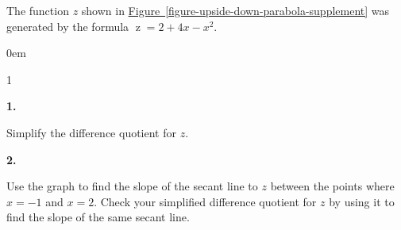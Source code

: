 \documentclass[12pt,]{book}
\theoremstyle{plain}
\theoremstyle{definition}
\numberwithin{equation}{section}
\newcommand{\hrulemedium}{\noalign{\hrule height 0.07em}}
\newcommand{\hrulethick} {\noalign{\hrule height 0.11em}}
\newcounter{figstack}
\newcounter{figindex}
\newlength\fight
\newcommand\pushValignCaptionBottom[5][b]{%
\stepcounter{figstack}%
\expandafter\def\csname %
figalign\romannumeral\value{figstack}\endcsname{#1}%
\expandafter\def\csname %
figtype\romannumeral\value{figstack}\endcsname{#2}%
\expandafter\def\csname %
figwd\romannumeral\value{figstack}\endcsname{#3}%
\expandafter\def\csname %
figcontent\romannumeral\value{figstack}\endcsname{#4}%
\expandafter\def\csname %
figcap\romannumeral\value{figstack}\endcsname{#5}%
\setbox0=\hbox{%
\begin{#2}{#3}#4\end{#2}}%
\ifdim\dimexpr\ht0+\dp0\relax>\fight\global\setlength{\fight}{%
\dimexpr\ht0+\dp0\relax}\fi%
}
\newcommand\popValignCaptionBottom{%
\setcounter{figindex}{0}%
\hfill%
\whiledo{\value{figindex}<\value{figstack}}{%
\stepcounter{figindex}%
\def\tmp{\csname figwd\romannumeral\value{figindex}\endcsname}%
\begin{\csname figtype\romannumeral\value{figindex}\endcsname}[t]{\tmp}%
\centering%
\stackinset{c}{}%
{\csname figalign\romannumeral\value{figindex}\endcsname}{}%
{\csname figcontent\romannumeral\value{figindex}\endcsname}%
{\rule{0pt}{\fight}}\par%
\csname figcap\romannumeral\value{figindex}\endcsname%
\end{\csname figtype\romannumeral\value{figindex}\endcsname}%
\hfill%
}%
\setcounter{figstack}{0}%
\setlength{\fight}{0pt}%
\hfill%
}
\newenvironment{exercisegroup}%
{\medskip\noindent}%
{\par\bigskip}%
\newlength{\exercisegroupindent}%
\newlength{\exercisegroupitemwidth}%
\newenvironment{exercisegrouplist}%
{\vspace{-\partopsep}%
\begin{adjustwidth}{\exercisegroupindent}{0em}}%
{\end{adjustwidth}%
\vspace{-\partopsep}%
\vspace{\baselineskip}}%
\newenvironment{exercisegroupbycol}[1]%
{\begin{exercisegrouplist}%
\vspace{-\multicolsep}%
\begin{multicols}{#1}%
\setlength{\parindent}{0em}%
\setlength{\exercisegroupitemwidth}{\linewidth}}%
{\end{multicols}%
\vspace{-\multicolsep}%
\end{exercisegrouplist}}%
\newenvironment{exercisegroupitem}[1]%
{\begin{minipage}[t]{\exercisegroupitemwidth}
\vspace{0pt}%
{\bfseries#1}%
\rule{0pt}{\baselineskip}}{\strut%
\end{minipage}%
\hspace{\columnsep}}%
\providecommand\phantomsection{}
\newcommand{\fe}[2]{\mathop{{#1}{\left(#2\right)}}}
\begin{document}
\begin{exercisegroup}%
The function \(z\) shown in \hyperref[figure-upside-down-parabola-supplement]{Figure~\ref*{figure-upside-down-parabola-supplement}} was generated by the formula \(\fe{z}{x}=2+4x-x^2\).%
\par
\begin{exercisegroupbycol}{1}%
\begin{exercisegroupitem}{1. }\phantomsection\hypertarget{exercise-30}{\null}
Simplify the difference quotient for \(z\).%
\end{exercisegroupitem}%
\par%
\begin{exercisegroupitem}{2. }\phantomsection\hypertarget{exercise-31}{\null}
Use the graph to find the slope of the secant line to \(z\) between the points where \(x=-1\) and \(x=2\).  Check your simplified difference quotient for \(z\) by using it to find the slope of the same secant line.%
\end{exercisegroupitem}%
\par%

\end{exercisegroupbycol}
\end{exercisegroup}
\end{document}
